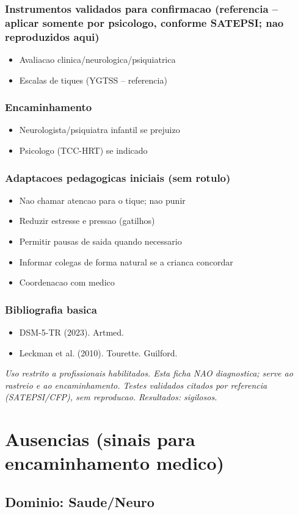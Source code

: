 \documentclass[a4paper,11pt]{book}
\newcommand{\avisolegal}{\par\medskip\noindent\footnotesize\itshape
\color{cinza}Uso restrito a profissionais habilitados. Esta ficha NAO diagnostica;
serve ao rastreio e ao encaminhamento. Testes validados citados por referencia
(SATEPSI/CFP), sem reproducao. Resultados: sigilosos.\color{black}\par}
\begin{document}
\subsection*{Instrumentos validados para confirmacao (referencia -- aplicar somente por psicologo, conforme SATEPSI; nao reproduzidos aqui)}
\begin{itemize}
\item Avaliacao clinica/neurologica/psiquiatrica
\item Escalas de tiques (YGTSS -- referencia)
\end{itemize}
\subsection*{Encaminhamento}
\begin{itemize}
\item Neurologista/psiquiatra infantil se prejuizo
\item Psicologo (TCC-HRT) se indicado
\end{itemize}
\subsection*{Adaptacoes pedagogicas iniciais (sem rotulo)}
\begin{itemize}
\item Nao chamar atencao para o tique; nao punir
\item Reduzir estresse e pressao (gatilhos)
\item Permitir pausas de saida quando necessario
\item Informar colegas de forma natural se a crianca concordar
\item Coordenacao com medico
\end{itemize}
\subsection*{Bibliografia basica}
\begin{itemize}
\item DSM-5-TR (2023). Artmed.
\item Leckman et al. (2010). Tourette. Guilford.
\end{itemize}
\avisolegal


\chapter{Ausencias (sinais para encaminhamento medico)}
\section*{Dominio: Saude/Neuro}
\end{document}
